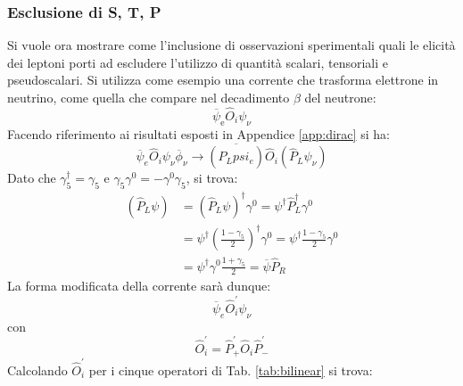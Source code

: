 \documentclass{subnucbo}
\begin{document}
\subsubsection{Esclusione di S, T, P}
Si vuole ora mostrare come l'inclusione di osservazioni sperimentali quali le elicità dei leptoni porti ad escludere l'utilizzo di quantità scalari, tensoriali e pseudoscalari. Si utilizza come esempio una corrente che trasforma elettrone in neutrino, come quella che compare nel decadimento $\beta$ del neutrone:
\begin{equation}
        \overline { \psi } _ { \mathrm { e } } \hat { O } _ { i } \psi _ { \nu }
        \label{eq:e_nu_current}
\end{equation}
Facendo riferimento ai risultati esposti in Appendice \ref{app:dirac} si ha:
\begin{equation}
        \overline { \psi} _ {e} \hat { O } _ { i } \psi _ { \nu } \overline{\phi}_{\nu} \rightarrow \overline { \left( \hat { P } _ { L }  psi_ {e} \right) } \hat { O } _ { i } \left( \hat { P } _ { L } \psi _ { \nu } \right)
\end{equation}
Dato che $\gamma _ { 5 } ^ { \dagger } = \gamma _ { 5 }$ e $\gamma _ { 5 } \gamma ^ { 0 } = - \gamma ^ { 0 } \gamma _ { 5 }$, si trova:
\begin{equation}
        \begin{aligned}
                \left( \hat { P } _ { L } \psi \right) & = \left( \hat { P } _ { L }  \psi \right) ^ { \dagger } \gamma ^ { 0 } = \psi ^ { \dagger } \hat { P } _ { L } ^ { \dagger } \gamma ^ { 0 } \\ & = \psi ^ { \dagger } \left( \frac { 1 - \gamma _ { 5 } } { 2 } \right) ^ { \dagger } \gamma ^ { 0 } = \psi ^ { \dagger } \frac { 1 - \gamma _ { 5 } } { 2 } \gamma ^ { 0 } \\ & = \psi ^ { \dagger } \gamma ^ { 0 } \frac { 1 + \gamma _ { 5 } } { 2 } = \overline { \psi } \hat { P } _ { R }
        \end{aligned}
\end{equation}
La forma modificata della corrente sarà dunque:
\begin{equation}
        \overline { \psi } _ {e} \hat { O } _ { i } ^ { \prime } \psi _ { \nu }
\end{equation}
con
\begin{equation}
        \hat { O } _ { i } ^ { \prime } = \hat { P } _ { + } ^ { \prime } \hat { O } _ { i } \hat { P } _ { - } ^ { \prime }
\end{equation}
Calcolando $\hat { O } _ { i } ^ { \prime }$ per i cinque operatori di Tab. \ref{tab:bilinear} si trova:
\end{document}
